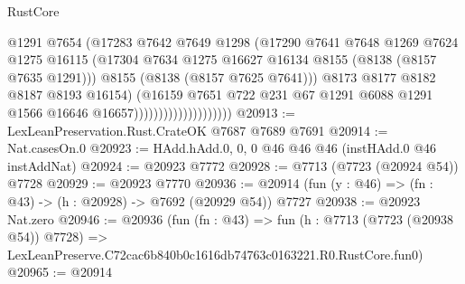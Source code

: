 \begin{lexlean}{RustCore}
\begin{coremodule}
                                          @1291
                                          @7654
                                          (@17283
                                            @7642
                                            @7649
                                            @1298
                                            (@17290
                                              @7641
                                              @7648
                                              @1269
                                              @7624
                                              @1275
                                              @16115
                                              (@17304
                                                @7634
                                                @1275
                                                @16627
                                                @16134
                                                @8155
                                                (@8138 (@8157 @7635 @1291)))
                                              @8155
                                              (@8138 (@8157 @7625 @7641)))
                                            @8173
                                            @8177
                                            @8182
                                            @8187
                                            @8193
                                            @16154)
                                          (@16159
                                            @7651
                                            @722
                                            @231
                                            @67
                                            @1291
                                            @6088
                                            @1291
                                            @1566
                                            @16646
                                            @16657))))))))))))))))))))
@20913 := LexLeanPreservation.Rust.CrateOK @7687 @7689 @7691
@20914 := Nat.casesOn.{0}
@20923 := HAdd.hAdd.{0, 0, 0} @46 @46 @46 (instHAdd.{0} @46 instAddNat)
@20924 := @20923 @7772
@20928 := @7713 (@7723 (@20924 @54)) @7728
@20929 := @20923 @7770
@20936 := @20914 (fun (y : @46) => (fn : @43) -> (h : @20928) -> @7692 (@20929 @54)) @7727
@20938 := @20923 Nat.zero
@20946 := @20936
    (fun (fn : @43) =>
    fun (h : @7713 (@7723 (@20938 @54)) @7728) =>
    LexLeanPreserve.C72cac6b840b0c1616db74763c0163221.R0.RustCore.fun0)
@20965 := @20914

\end{coremodule}
\end{lexlean}
